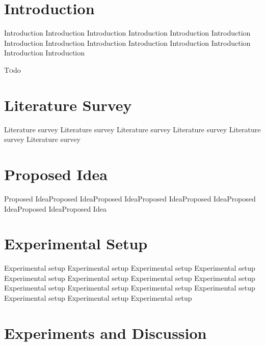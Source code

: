 \documentclass[twoside]{article}
\begin{document}
\begin{multicols}{2} %

\section{Introduction}
Introduction Introduction Introduction Introduction Introduction Introduction Introduction Introduction Introduction Introduction Introduction Introduction Introduction Introduction 

\lettrine[nindent=0em,lines=3]{T}odo



\section{Literature Survey}

Literature survey Literature survey Literature survey Literature survey Literature survey Literature survey 



\section{Proposed Idea}

Proposed IdeaProposed IdeaProposed IdeaProposed IdeaProposed IdeaProposed IdeaProposed IdeaProposed Idea


\section{Experimental Setup}

Experimental setup Experimental setup Experimental setup Experimental setup Experimental setup Experimental setup Experimental setup Experimental setup Experimental setup Experimental setup Experimental setup Experimental setup Experimental setup Experimental setup Experimental setup 


\section{Experiments and Discussion}


\end{multicols}
\end{document}
